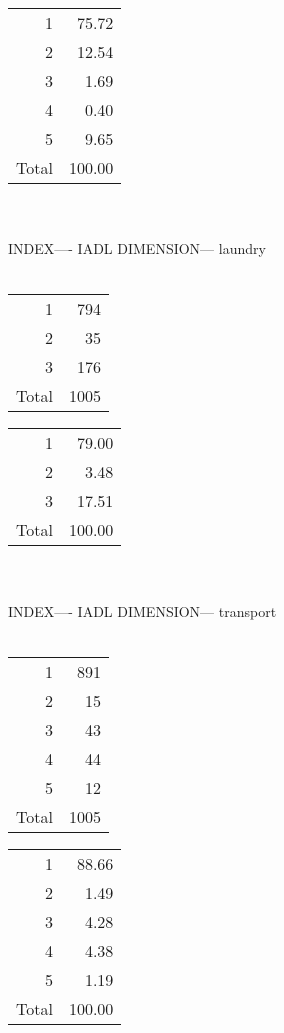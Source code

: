 \documentclass[11pt]{article}
\begin{document}
% 
\begin{tabular}{rr}
   \hline
1 & 75.72 \\ 
  2 & 12.54 \\ 
  3 & 1.69 \\ 
  4 & 0.40 \\ 
  5 & 9.65 \\ 
  Total & 100.00 \\ 
   \hline
\end{tabular}
\\\\ 
INDEX---- IADL DIMENSION--- laundry 
 \\\\ 
% 
\begin{tabular}{rr}
   \hline
1 & 794 \\ 
  2 &  35 \\ 
  3 & 176 \\ 
  Total & 1005 \\ 
   \hline
\end{tabular}
% 
\begin{tabular}{rr}
   \hline
1 & 79.00 \\ 
  2 & 3.48 \\ 
  3 & 17.51 \\ 
  Total & 100.00 \\ 
   \hline
\end{tabular}
\\\\ 
INDEX---- IADL DIMENSION--- transport 
 \\\\ 
% 
\begin{tabular}{rr}
   \hline
1 & 891 \\ 
  2 &  15 \\ 
  3 &  43 \\ 
  4 &  44 \\ 
  5 &  12 \\ 
  Total & 1005 \\ 
   \hline
\end{tabular}
% 
\begin{tabular}{rr}
   \hline
1 & 88.66 \\ 
  2 & 1.49 \\ 
  3 & 4.28 \\ 
  4 & 4.38 \\ 
  5 & 1.19 \\ 
  Total & 100.00 \\ 
   \hline
\end{tabular}
\end{document}
